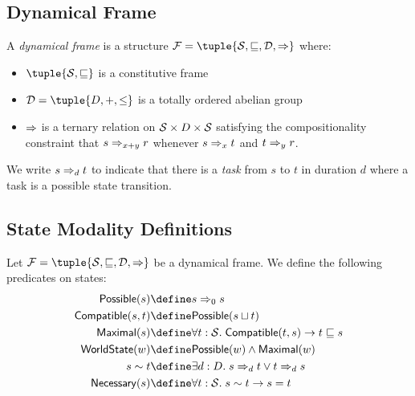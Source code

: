 \documentclass[../LogosReference.tex]{subfiles}
\begin{document}

\subsection{Dynamical Frame}\label{sec:dynamical-frame}

\begin{definition}\label{def:dynamical-frame}
	A \emph{dynamical frame} is a structure $\mframe = \tuple{\statespace, \parthood, \temporalorder, \taskrel}$ where:
	\begin{itemize}
		\item $\tuple{\statespace, \parthood}$ is a constitutive frame
		\item $\temporalorder = \tuple{D, +, \leq}$ is a totally ordered abelian group
		\item $\Rightarrow$ is a ternary relation on $\mathcal{S} \times D \times \mathcal{S}$ satisfying the compositionality constraint that $s \Rightarrow_{x+y} r$ whenever $s \Rightarrow_{x} t$ and $t \Rightarrow_{y} r$.
	\end{itemize}
\end{definition}

\begin{notation}
  We write $s \Rightarrow_{d} t$ to indicate that there is a \textit{task} from $s$ to $t$ in duration $d$ where a task is a possible state transition.
\end{notation}


\subsection{State Modality Definitions}\label{sec:state-modality}


\begin{definition}\label{def:state-modality}
Let $\mframe = \tuple{\statespace, \parthood, \temporalorder, \taskrel}$ be a dynamical frame.
We define the following predicates on states:
\begin{align}
    \mathsf{Possible}(s) &\define \task{s}{0}{s} \\
    \mathsf{Compatible}(s, t) &\define \mathsf{Possible}(\fusion{s}{t}) \\
    \mathsf{Maximal}(s) &\define \forall t : \statespace.\; \mathsf{Compatible}(t, s) \to t \parthood s \\
    \mathsf{WorldState}(w) &\define \mathsf{Possible}(w) \land \mathsf{Maximal}(w) \\
    s \connected t &\define \exists d : D.\; \task{s}{d}{t} \lor \task{t}{d}{s} \\
    \mathsf{Necessary}(s) &\define \forall t : \statespace.\; s \connected t \to s = t
\end{align}
\end{definition}
\end{document}
